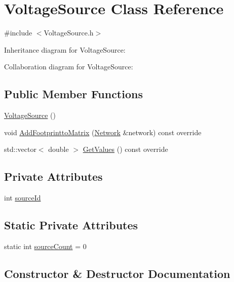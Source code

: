 \hypertarget{classVoltageSource}{}\section{Voltage\+Source Class Reference}
\label{classVoltageSource}


{\ttfamily \#include $<$Voltage\+Source.\+h$>$}



Inheritance diagram for Voltage\+Source\+:


Collaboration diagram for Voltage\+Source\+:
\subsection*{Public Member Functions}
\begin{DoxyCompactItemize}
\item 
\hyperlink{classVoltageSource_ae3b883cc8397885241817471081f1f1b}{Voltage\+Source} ()
\item 
void \hyperlink{classVoltageSource_a74f8a6a57480e9cff24414e106d2bbf1}{Add\+Footprintto\+Matrix} (\hyperlink{classNetwork}{Network} \&network) const override
\item 
std\+::vector$<$ double $>$ \hyperlink{classVoltageSource_addf30a4714e13d83fd5a18e6d9a4310b}{Get\+Values} () const override
\end{DoxyCompactItemize}
\subsection*{Private Attributes}
\begin{DoxyCompactItemize}
\item 
int \hyperlink{classVoltageSource_a34411acea2cb7d017e1b5c0b826d69a6}{source\+Id}
\end{DoxyCompactItemize}
\subsection*{Static Private Attributes}
\begin{DoxyCompactItemize}
\item 
static int \hyperlink{classVoltageSource_ade16a2431763eeff86ec7a4f842cf6f0}{source\+Count} = 0
\end{DoxyCompactItemize}


\subsection{Constructor \& Destructor Documentation}
\mbox{\label{classVoltageSource_ae3b883cc8397885241817471081f1f1b}} 
